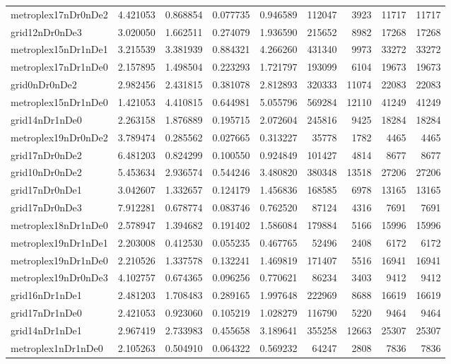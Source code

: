 \begin{longtable}{|l|r|r|r|r|r|r|r|r|}
metroplex17nDr0nDe2 & 4.421053 & 0.868854 & 0.077735 & 0.946589 & 112047 & 3923 & 11717 & 11717 \\
grid12nDr0nDe3 & 3.020050 & 1.662511 & 0.274079 & 1.936590 & 215652 & 8982 & 17268 & 17268 \\
metroplex15nDr1nDe1 & 3.215539 & 3.381939 & 0.884321 & 4.266260 & 431340 & 9973 & 33272 & 33272 \\
metroplex17nDr1nDe0 & 2.157895 & 1.498504 & 0.223293 & 1.721797 & 193099 & 6104 & 19673 & 19673 \\
grid0nDr0nDe2 & 2.982456 & 2.431815 & 0.381078 & 2.812893 & 320333 & 11074 & 22083 & 22083 \\
metroplex15nDr1nDe0 & 1.421053 & 4.410815 & 0.644981 & 5.055796 & 569284 & 12110 & 41249 & 41249 \\
grid14nDr1nDe0 & 2.263158 & 1.876889 & 0.195715 & 2.072604 & 245816 & 9425 & 18284 & 18284 \\
metroplex19nDr0nDe2 & 3.789474 & 0.285562 & 0.027665 & 0.313227 & 35778 & 1782 & 4465 & 4465 \\
grid17nDr0nDe2 & 6.481203 & 0.824299 & 0.100550 & 0.924849 & 101427 & 4814 & 8677 & 8677 \\
grid10nDr0nDe2 & 5.453634 & 2.936574 & 0.544246 & 3.480820 & 380348 & 13518 & 27206 & 27206 \\
grid17nDr0nDe1 & 3.042607 & 1.332657 & 0.124179 & 1.456836 & 168585 & 6978 & 13165 & 13165 \\
grid17nDr0nDe3 & 7.912281 & 0.678774 & 0.083746 & 0.762520 & 87124 & 4316 & 7691 & 7691 \\
metroplex18nDr1nDe0 & 2.578947 & 1.394682 & 0.191402 & 1.586084 & 179884 & 5166 & 15996 & 15996 \\
metroplex19nDr1nDe1 & 2.203008 & 0.412530 & 0.055235 & 0.467765 & 52496 & 2408 & 6172 & 6172 \\
metroplex19nDr1nDe0 & 2.210526 & 1.337578 & 0.132241 & 1.469819 & 171407 & 5516 & 16941 & 16941 \\
metroplex19nDr0nDe3 & 4.102757 & 0.674365 & 0.096256 & 0.770621 & 86234 & 3403 & 9412 & 9412 \\
grid16nDr1nDe1 & 2.481203 & 1.708483 & 0.289165 & 1.997648 & 222969 & 8688 & 16619 & 16619 \\
grid17nDr1nDe0 & 2.421053 & 0.923060 & 0.105219 & 1.028279 & 116790 & 5220 & 9464 & 9464 \\
grid14nDr1nDe1 & 2.967419 & 2.733983 & 0.455658 & 3.189641 & 355258 & 12663 & 25307 & 25307 \\
metroplex1nDr1nDe0 & 2.105263 & 0.504910 & 0.064322 & 0.569232 & 64247 & 2808 & 7836 & 7836 \\

\end{longtable}
